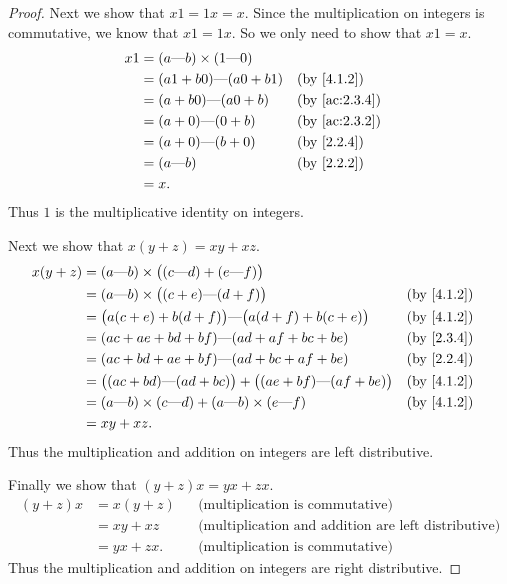 \begin{proof}
  Next we show that \(x1 = 1x = x\).
  Since the multiplication on integers is commutative, we know that \(x1 = 1x\).
  So we only need to show that \(x1 = x\).
  \begin{align*}
    x1 & = (a \text{---} b) \times (1 \text{---} 0)                                  \\
       & = (a1 + b0) \text{---} (a0 + b1)           &  & \text{(by \cref{4.1.2})}    \\
       & = (a + b0) \text{---} (a0 + b)             &  & \text{(by \cref{ac:2.3.4})} \\
       & = (a + 0) \text{---} (0 + b)               &  & \text{(by \cref{ac:2.3.2})} \\
       & = (a + 0) \text{---} (b + 0)               &  & \text{(by \cref{2.2.4})}    \\
       & = (a \text{---} b)                         &  & \text{(by \cref{2.2.2})}    \\
       & = x.
  \end{align*}
  Thus \(1\) is the multiplicative identity on integers.

  Next we show that \(x(y + z) = xy + xz\).
  \begin{align*}
    x(y + z) & = (a \text{---} b) \times \big((c \text{---} d) + (e \text{---} f)\big)                                             \\
             & = (a \text{---} b) \times \big((c + e) \text{---} (d + f)\big)                        &  & \text{(by \cref{4.1.2})} \\
             & = \big(a(c + e) + b(d + f)\big) \text{---} \big(a(d + f) + b(c + e)\big)              &  & \text{(by \cref{4.1.2})} \\
             & = (ac + ae + bd + bf) \text{---} (ad + af + bc + be)                                  &  & \text{(by \cref{2.3.4})} \\
             & = (ac + bd + ae + bf) \text{---} (ad + bc + af + be)                                  &  & \text{(by \cref{2.2.4})} \\
             & = \big((ac + bd) \text{---} (ad + bc)\big) + \big((ae + bf) \text{---} (af + be)\big) &  & \text{(by \cref{4.1.2})} \\
             & = (a \text{---} b) \times (c \text{---} d) + (a \text{---} b) \times (e \text{---} f) &  & \text{(by \cref{4.1.2})} \\
             & = xy + xz.
  \end{align*}
  Thus the multiplication and addition on integers are left distributive.

  Finally we show that \((y + z)x = yx + zx\).
  \begin{align*}
    (y + z)x & = x(y + z) &  & \text{(multiplication is commutative)}                     \\
             & = xy + xz  &  & \text{(multiplication and addition are left distributive)} \\
             & = yx + zx. &  & \text{(multiplication is commutative)}
  \end{align*}
  Thus the multiplication and addition on integers are right distributive.
\end{proof}

